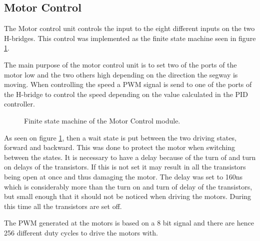 \subsection{Motor Control}
The Motor control unit controls the input to the eight different inputs on the two H-bridges.
This control was implemented as the finite state machine seen in figure \ref{fig:motorcontrol_fsm}.

The main purpose of the motor control unit is to set two of the ports of the motor low and the two others high depending on the direction the segway is moving.
When controlling the speed a PWM signal is send to one of the ports of the H-bridge to control the speed depending on the value calculated in the PID controller.


\begin{figure}[H]
\centering


\caption{Finite state machine of the Motor Control module.}
\label{fig:motorcontrol_fsm}
\end{figure}


As seen on figure \ref{fig:motorcontrol_fsm}, then a wait state is put between the two driving states, forward and backward.
This was done to protect the motor when switching between the states.
It is necessary to have a delay because of the turn of and turn on delays of the transistors.
If this is not set it may result in all the transistors being open at once and thus damaging the motor.
The delay was set to 160ns which is considerably more than the turn on and turn of delay of the transistors, but small enough that it should not be noticed when driving the motors.
During this time all the transistors are set off.

The PWM generated at the motors is based on a 8 bit signal and there are hence 256 different duty cycles to drive the motors with.
